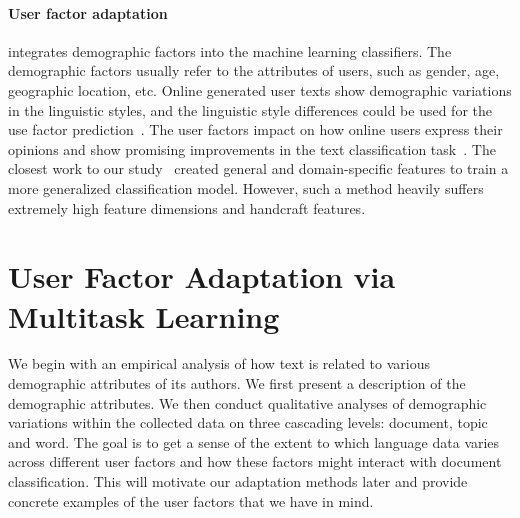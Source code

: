 \paragraph{User factor adaptation} integrates demographic factors into the machine learning classifiers. The demographic factors usually refer to the attributes of users, such as gender, age, geographic location, etc. Online generated user texts show demographic variations in the linguistic styles, and the linguistic style differences could be used for the use factor prediction~\cite{rosenthal2011age, zhang2016predicting, hovy2018improving}. The user factors impact on how online users express their opinions and show promising improvements in the text classification task~\cite{volkova2013exploring, hovy2015demographic, lynn2017human, yang2017overcoming}. The closest work to our study~\cite{lynn2017human} created general and domain-specific features to train a more generalized classification model. However, such a method heavily suffers extremely high feature dimensions and handcraft features. 



\section{User Factor Adaptation via Multitask Learning}
\label{sec:exploratory}

We begin with an empirical analysis of how text is related to various demographic attributes of its authors. We first present a description of the demographic attributes. We then conduct qualitative analyses of demographic variations within the collected data on three cascading levels: document, topic and word.
The goal is to get a sense of the extent to which language data varies across different user factors and how these factors might interact with document classification. 
This will motivate our adaptation methods later
and provide concrete examples of the user factors that we have in mind.


